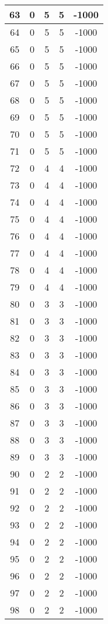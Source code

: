 \documentclass[letterpaper, 12pt]{article}
\begin{document}
\begin{longtable}{|c|c|c|c|c|}
\hline
63 & 0 & 5 & 5 & -1000 \\
\hline
64 & 0 & 5 & 5 & -1000 \\
\hline
65 & 0 & 5 & 5 & -1000 \\
\hline
66 & 0 & 5 & 5 & -1000 \\
\hline
67 & 0 & 5 & 5 & -1000 \\
\hline
68 & 0 & 5 & 5 & -1000 \\
\hline
69 & 0 & 5 & 5 & -1000 \\
\hline
70 & 0 & 5 & 5 & -1000 \\
\hline
71 & 0 & 5 & 5 & -1000 \\
\hline
72 & 0 & 4 & 4 & -1000 \\
\hline
73 & 0 & 4 & 4 & -1000 \\
\hline
74 & 0 & 4 & 4 & -1000 \\
\hline
75 & 0 & 4 & 4 & -1000 \\
\hline
76 & 0 & 4 & 4 & -1000 \\
\hline
77 & 0 & 4 & 4 & -1000 \\
\hline
78 & 0 & 4 & 4 & -1000 \\
\hline
79 & 0 & 4 & 4 & -1000 \\
\hline
80 & 0 & 3 & 3 & -1000 \\
\hline
81 & 0 & 3 & 3 & -1000 \\
\hline
82 & 0 & 3 & 3 & -1000 \\
\hline
83 & 0 & 3 & 3 & -1000 \\
\hline
84 & 0 & 3 & 3 & -1000 \\
\hline
85 & 0 & 3 & 3 & -1000 \\
\hline
86 & 0 & 3 & 3 & -1000 \\
\hline
87 & 0 & 3 & 3 & -1000 \\
\hline
88 & 0 & 3 & 3 & -1000 \\
\hline
89 & 0 & 3 & 3 & -1000 \\
\hline
90 & 0 & 2 & 2 & -1000 \\
\hline
91 & 0 & 2 & 2 & -1000 \\
\hline
92 & 0 & 2 & 2 & -1000 \\
\hline
93 & 0 & 2 & 2 & -1000 \\
\hline
94 & 0 & 2 & 2 & -1000 \\
\hline
95 & 0 & 2 & 2 & -1000 \\
\hline
96 & 0 & 2 & 2 & -1000 \\
\hline
97 & 0 & 2 & 2 & -1000 \\
\hline
98 & 0 & 2 & 2 & -1000 \\

\end{longtable}
\end{document}
